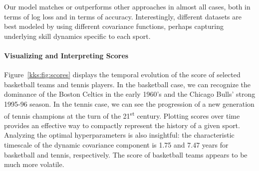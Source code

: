 Our model matches or outperforms other approaches in almost all cases, both in terms of log loss and in terms of accuracy.
Interestingly, different datasets are best modeled by using different covariance functions, perhaps capturing underlying skill dynamics specific to each sport.

\paragraph{Visualizing and Interpreting Scores}
Figure~\ref{kks:fig:scores} displays the temporal evolution of the score of selected basketball teams and tennis players.
In the basketball case, we can recognize the dominance of the Boston Celtics in the early 1960's and the Chicago Bulls' strong 1995-96 season.
In the tennis case, we can see the progression of a new generation of tennis champions at the turn of the 21\textsuperscript{st} century.
Plotting scores over time provides an effective way to compactly represent the history of a given sport.
Analyzing the optimal hyperparameters is also insightful: the characteristic timescale of the dynamic covariance component is \num{1.75} and \num{7.47} years for basketball and tennis, respectively.
The score of basketball teams appears to be much more volatile.



